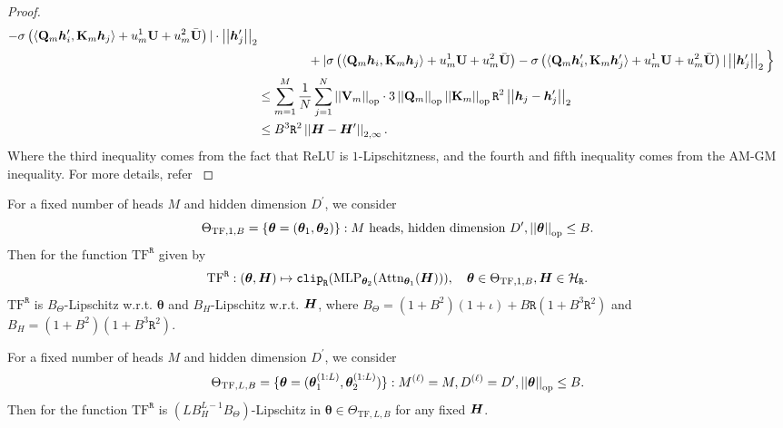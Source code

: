\begin{proof}
\begin{align*}
        -
        \sigma
        \left( \langle \mathbf{Q}_m \bm{h}_i^\prime, \mathbf{K}_m \bm{h}_j \rangle + u^1_m \mathbf{U} + u^2_m \bar{\mathbf{U}} \right)
        \vert
        \cdot
        \left\lvert \left\lvert\bm{h}_j^\prime\right\rvert \right\rvert_2
        \\
        &\quad\quad\quad\quad+
        \vert
        \sigma
        \left( \langle \mathbf{Q}_m \bm{h}_i, \mathbf{K}_m \bm{h}_j \rangle + u^1_m \mathbf{U} + u^2_m \bar{\mathbf{U}} \right)
        -
        \sigma
        \left( \langle \mathbf{Q}_m \bm{h}_i^\prime, \mathbf{K}_m \bm{h}_j^\prime \rangle + u^1_m \mathbf{U} + u^2_m \bar{\mathbf{U}} \right)
        \vert
        \left\lvert \left\lvert\bm{h}_j^\prime\right\rvert \right\rvert_2
        \Big\}
        \\
        &\leq
        \sum_{m=1}^M
        \frac{1}{N}
        \sum_{j=1}^N
        \left\lvert \left\lvert\mathbf{V}_m\right\rvert \right\rvert_{\text{op}}
        \cdot
        3
        \left\lvert \left\lvert\mathbf{Q}_m\right\rvert \right\rvert_{\text{op}}
        \left\lvert \left\lvert\mathbf{K}_m\right\rvert \right\rvert_{\text{op}}
        \mathtt{R}^2
        \left\lvert \left\lvert\bm{h}_j - \bm{h}_j^\prime\right\rvert \right\rvert_2
        \\
        &\leq
        B^3 \mathtt{R}^2 \left\lvert \left\lvert\bm{H} - \bm{H}^\prime\right\rvert \right\rvert_{2, \infty}.
    \end{align*}
    Where the third inequality comes from the fact that ReLU is $1$-Lipschitzness, and the fourth and fifth inequality comes from the AM-GM inequality.
    For more details, refer \citep[Section~J.2]{bai2024transformers}
\end{proof}

\begin{corollary}
    For a fixed number of heads $M$ and hidden dimension $D^\prime$, we consider
    \[
    \Theta_{\text{TF}, 1, B}
    =
    \{
    \bm{\theta}
    =
    ( \bm{\theta}_1, \bm{\theta}_2 )
    \}
    :
    M \text{ heads, }
    \text{hidden dimension }
    D^\prime,
    \left\lvert \left\lvert\bm{\theta}\right\rvert \right\rvert_{\text{op}}
    \leq 
    B.
    \]
    Then for the function $\text{TF}^{\mathtt{R}}$ given by
    \[
    \text{TF}^{\mathtt{R}}
    :
    ( \bm{\theta}, \bm{H} )
    \mapsto
    \texttt{clip}_{\mathtt{R}}
    (
    \text{MLP}_{\bm{\theta}_2}
    (
    \text{Attn}_{\bm{\theta}_1}
    (
    \bm{H}
    )
    )),
    \quad
    \bm{\theta} \in 
    \Theta_{\text{TF}, 1, B},
    \bm{H} \in \mathcal{H}_{\mathtt{R}}.
    \]
    $\text{TF}^{\mathtt{R}}$ is $B_{\Theta}$-Lipschitz w.r.t. $\bm{\theta}$ and $B_H$-Lipschitz w.r.t. $\bm{H}$,
    where 
    $B_{\Theta} = (1 + B^2) ( 1 + \iota ) + B\mathtt{R}(1 + B^3\mathtt{R}^2)$
    and 
    $B_H = (1 + B^2)(1 + B^3 \mathtt{R}^2 )$.
\end{corollary}


\begin{proposition}\label{proposition:lipschitz-moirai}
    For a fixed number of heads $M$ and hidden dimension $D^\prime$, we consider
    \[
    \Theta_{\text{TF}, L, B}
    =
    \{
    \bm{\theta}
    =
    ( \bm{\theta}_1^{(1:L)}, \bm{\theta}_2^{(1:L)} )
    \}
    :
    M^{(\ell)} = M,
    D^{(\ell)}
    =
    D^\prime,
    \left\lvert \left\lvert\bm{\theta}\right\rvert \right\rvert_{\text{op}}
    \leq 
    B.
    \]
    Then for the function $\text{TF}^{\mathtt{R}}$ is $(L B_H^{L-1} B_{\Theta})$-Lipschitz in $\bm{\theta} \in \Theta_{\text{TF}, L, B}$ for any fixed $\bm{H}$.
\end{proposition}


